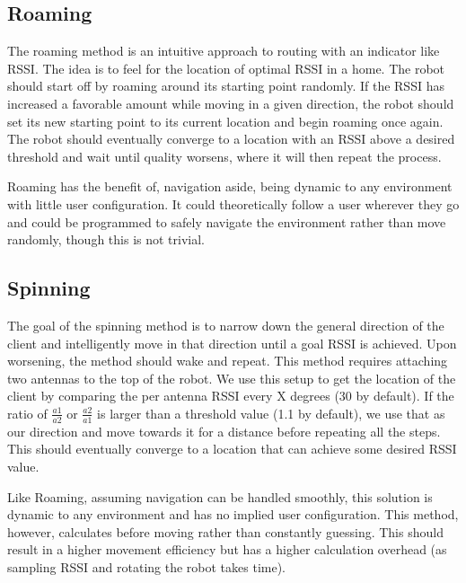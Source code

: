 \subsection{Roaming}
The roaming method is an intuitive approach to routing with an indicator like RSSI. The idea is to feel for the location of optimal RSSI in a home. The robot should start off by roaming around its starting point randomly. If the RSSI has increased a favorable amount while moving in a given direction, the robot should set its new starting point to its current location and begin roaming once again. The robot should eventually converge to a location with an RSSI above a desired threshold and wait until quality worsens, where it will then repeat the process.\par
Roaming has the benefit of, navigation aside, being dynamic to any environment with little user configuration. It could theoretically follow a user wherever they go and could be programmed to safely navigate the environment rather than move randomly, though this is not trivial.

\subsection{Spinning}
The goal of the spinning method is to narrow down the general direction of the client and intelligently move in that direction until a goal RSSI is achieved. Upon worsening, the method should wake and repeat. This method requires attaching two antennas to the top of the robot. We use this setup to get the location of the client by comparing the per antenna RSSI every X degrees (30 by default). If the ratio of \(\frac{a1}{a2}\) or \(\frac{a2}{a1}\) is larger than a threshold value (1.1 by default), we use that as our direction and move towards it for a distance before repeating all the steps. This should eventually converge to a location that can achieve some desired RSSI value.\par
Like Roaming, assuming navigation can be handled smoothly, this solution is dynamic to any environment and has no implied user configuration. This method, however, calculates before moving rather than constantly guessing. This should result in a higher movement efficiency but has a higher calculation overhead (as sampling RSSI and rotating the robot takes time).

